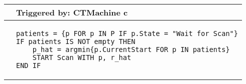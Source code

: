 \begin{tabular}{@{}>{\raggedright\arraybackslash}p{0.25cm}>{\raggedright\arraybackslash}p{13cm}@{}}
  \toprule
   & Triggered by: CTMachine c\\ \midrule 
  &
\begin{lstlisting}[language=CMPseudo]
patients = {p FOR p IN P IF p.State = "Wait for Scan"}
IF patients IS NOT empty THEN 
    p_hat = argmin{p.CurrentStart FOR p IN patients}
    START Scan WITH p, r_hat
END IF
  \end{lstlisting}
  \\ \bottomrule
  \end{tabular}